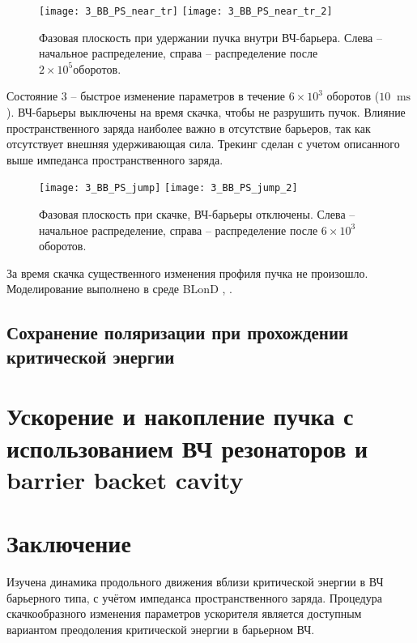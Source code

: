 \begin{figure}
   \texttt{[image: 3\_BB\_PS\_near\_tr]}
   \texttt{[image: 3\_BB\_PS\_near\_tr\_2]}
   \caption{Фазовая плоскость при удержании пучка внутри ВЧ-барьера. Слева – начальное распределение, справа – распределение после $2\times{10}^5 оборотов$.}
   \label{fig:2}
\end{figure}

\par Состояние 3 – быстрое изменение параметров в течение $6\times{10}^3$ о\-бо\-ро\-тов ($10~\text{ ms}$). ВЧ-барьеры выключены на время скачка, чтобы не разрушить пучок. Влияние пространственного заряда наиболее важно в отсутствие барь\-е\-ров, так как отсутствует внешняя удерживающая сила. Трекинг сделан с учетом описанного выше импеданса пространственного заряда.

\begin{figure}[!h]
   \texttt{[image: 3\_BB\_PS\_jump]}
   \texttt{[image: 3\_BB\_PS\_jump\_2]}
   \caption{Фазовая плоскость при скачке, ВЧ-барьеры отключены. Слева – начальное распределение, справа – распределение после $6\times{10}^3$ оборотов.}
   \label{fig:3}
\end{figure}

\par За время скачка существенного изменения профиля пучка не про\-и\-зош\-ло. Моделирование выполнено в среде BLonD \cite{blond1}, \cite{blond}.

	\subsection{Сохранение поляризации при прохождении критической энергии}\label{subsec:transition_jump/regular/polarization}

\section{Ускорение и накопление пучка с использованием ВЧ резонаторов и barrier backet cavity}\label{subsec:transition_jump/regular/BB}

	\section{Заключение}
\par Изучена динамика продольного движения вблизи критической э\-нер\-гии в ВЧ барьерного типа, с учётом импеданса пространственного заряда. Процедура скачкообразного изменения параметров ускорителя является доступным вариантом преодоления критической энергии в барьерном ВЧ.

\FloatBarrier
